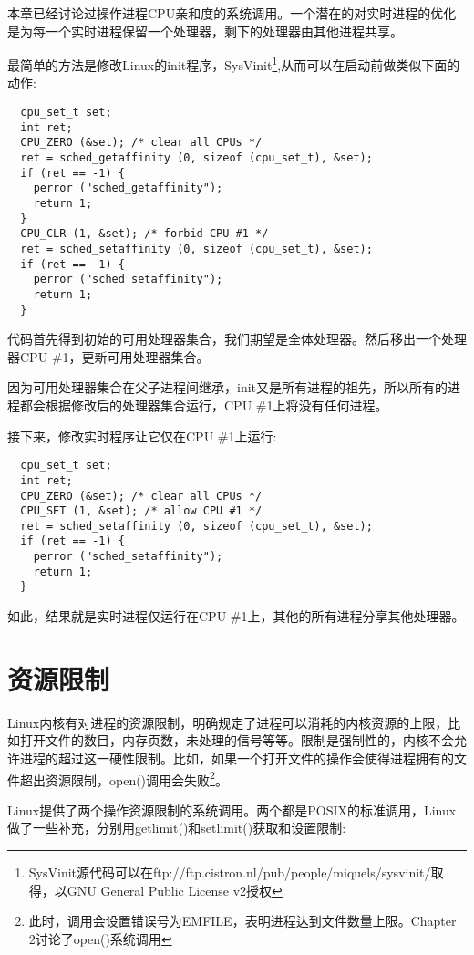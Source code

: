   本章已经讨论过操作进程CPU亲和度的系统调用。一个潜在的对实时进程的优化是为每一个实时进程保留一个处理器，剩下的处理器由其他进程共享。

  最简单的方法是修改Linux的init程序，SysVinit\footnote[1]{SysVinit源代码可以在ftp://ftp.cistron.nl/pub/people/miquels/sysvinit/取得，以GNU General Public License v2授权},从而可以在启动前做类似下面的动作:

\begin{lstlisting}
  cpu_set_t set;
  int ret;
  CPU_ZERO (&set); /* clear all CPUs */
  ret = sched_getaffinity (0, sizeof (cpu_set_t), &set);
  if (ret == -1) {
    perror ("sched_getaffinity");
    return 1;
  }
  CPU_CLR (1, &set); /* forbid CPU #1 */
  ret = sched_setaffinity (0, sizeof (cpu_set_t), &set);
  if (ret == -1) {
    perror ("sched_setaffinity");
    return 1;
  }
\end{lstlisting}

  代码首先得到初始的可用处理器集合，我们期望是全体处理器。然后移出一个处理器CPU \#1，更新可用处理器集合。

  因为可用处理器集合在父子进程间继承，init又是所有进程的祖先，所以所有的进程都会根据修改后的处理器集合运行，CPU \#1上将没有任何进程。

  接下来，修改实时程序让它仅在CPU \#1上运行:

\begin{lstlisting}
  cpu_set_t set;
  int ret;
  CPU_ZERO (&set); /* clear all CPUs */
  CPU_SET (1, &set); /* allow CPU #1 */
  ret = sched_setaffinity (0, sizeof (cpu_set_t), &set);
  if (ret == -1) {
    perror ("sched_setaffinity");
    return 1;
  }
\end{lstlisting}

  如此，结果就是实时进程仅运行在CPU \#1上，其他的所有进程分享其他处理器。

\section{资源限制}

  Linux内核有对进程的资源限制，明确规定了进程可以消耗的内核资源的上限，比如打开文件的数目，内存页数，未处理的信号等等。限制是强制性的，内核不会允许进程的超过这一硬性限制。比如，如果一个打开文件的操作会使得进程拥有的文件超出资源限制，open()调用会失败\footnote[2]{此时，调用会设置错误号为EMFILE，表明进程达到文件数量上限。Chapter 2讨论了open()系统调用}。

  Linux提供了两个操作资源限制的系统调用。两个都是POSIX的标准调用，Linux做了一些补充，分别用getlimit()和setlimit()获取和设置限制:

